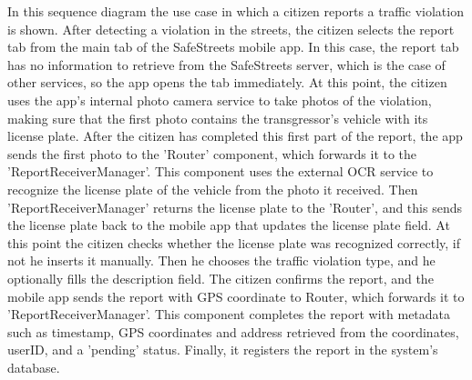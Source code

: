 In this sequence diagram the use case in which a citizen reports a traffic violation is shown. After detecting a violation in the streets, the citizen selects the report tab from the main tab of the SafeStreets mobile app. In this case, the report tab has no information to retrieve from the SafeStreets server, which is the case of other services, so the app opens the tab immediately. At this point, the citizen uses the app's internal photo camera service to take photos of the violation, making sure that the first photo contains the transgressor's vehicle with its license plate. After the citizen has completed this first part of the report, the app sends the first photo to the 'Router' component, which forwards it to the 'ReportReceiverManager'. This component uses the external OCR service to recognize the license plate of the vehicle from the photo it received. Then 'ReportReceiverManager' returns the license plate to the 'Router', and this sends the license plate back to the mobile app that updates the license plate field. At this point the citizen checks whether the license plate was recognized correctly, if not he inserts it manually. Then he chooses the traffic violation type, and he optionally fills the description field. The citizen confirms the report, and the mobile app sends the report with GPS coordinate to Router, which forwards it to 'ReportReceiverManager'. This component completes the report with metadata such as timestamp, GPS coordinates and address retrieved from the coordinates, userID, and a 'pending' status. Finally, it registers the report in the system's database.

